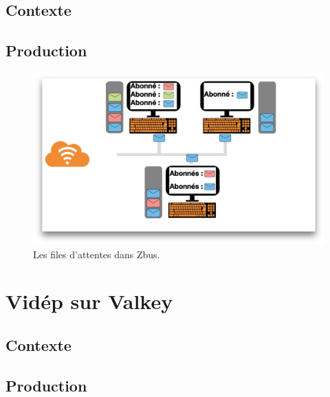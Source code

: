\subsection{Contexte}

\subsection{Production}
\begin{figure}[htp]
  \centering
  \includegraphics[width=15cm]{images/zbus/screensbus.png}
  \caption{Les files d'attentes dans Zbus.}
  \label{screenzbus}
\end{figure}



\section{Vidép sur Valkey}

\subsection{Contexte}

\subsection{Production}




